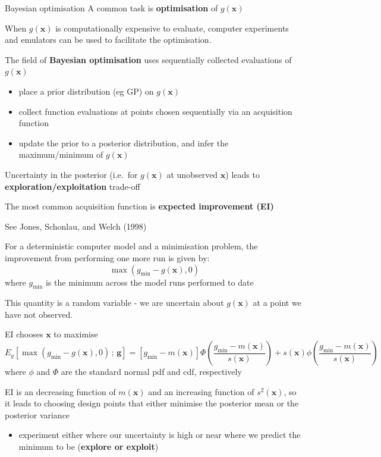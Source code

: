 \documentclass[
  ignorenonframetext,
]{beamer}
\providecommand{\tightlist}{%
  \setlength{\itemsep}{0pt}\setlength{\parskip}{0pt}}
\begin{document}
\begin{frame}{Bayesian optimisation}
\protect\hypertarget{bayesian-optimisation}{}
A common task is \textbf{optimisation} of \(g(\boldsymbol{x})\)

When \(g(\boldsymbol{x})\) is computationally expensive to evaluate,
computer experiments and emulators can be used to facilitate the
optimisation.

The field of \textbf{Bayesian optimisation} uses sequentially collected
evaluations of \(g(\boldsymbol{x})\)

\begin{itemize}
\tightlist
\item
  place a prior distribution (eg GP) on \(g(\boldsymbol{x})\)
\item
  collect function evaluations at points chosen sequentially via an
  acquisition function
\item
  update the prior to a posterior distribution, and infer the
  maximum/minimum of \(g(\boldsymbol{x})\)
\end{itemize}

Uncertainty in the posterior (i.e.~for \(g(\boldsymbol{x})\) at
unobserved \(\boldsymbol{x}\)) leads to
\textbf{exploration/exploitation} trade-off

The most common acquisition function is \textbf{expected improvement
(EI)}

See Jones, Schonlau, and Welch (1998)
\end{frame}

\begin{frame}{}
\protect\hypertarget{section-50}{}
For a deterministic computer model and a minimisation problem, the
improvement from performing one more run is given by: \[
\max(g_\min - g(\boldsymbol{x}), 0)
\] where \(g_\min\) is the minimum across the model runs performed to
date

This quantity is a random variable - we are uncertain about
\(g(\boldsymbol{x})\) at a point we have not observed.

EI chooses \(\boldsymbol{x}\) to maximise \[
E_g\left[\max(g_\min - g(\boldsymbol{x}), 0)\,;\, \boldsymbol{g}\right] = \left[g_\min - m(\boldsymbol{x})\right]\Phi\left(\frac{g_\min - m(\boldsymbol{x})}{s(\boldsymbol{x})}\right) + s(\boldsymbol{x})\phi\left(\frac{g_\min - m(\boldsymbol{x})}{s(\boldsymbol{x})}\right)
\] where \(\phi\) and \(\Phi\) are the standard normal pdf and cdf,
respectively

EI is an decreasing function of \(m(\boldsymbol{x})\) and an increasing
function of \(s^2(\boldsymbol{x})\), so it leads to choosing design
points that either minimise the posterior mean or the posterior variance

\begin{itemize}
\tightlist
\item
  experiment either where our uncertainty is high or near where we
  predict the minimum to be (\textbf{explore or exploit})
\end{itemize}
\end{frame}
\end{document}
